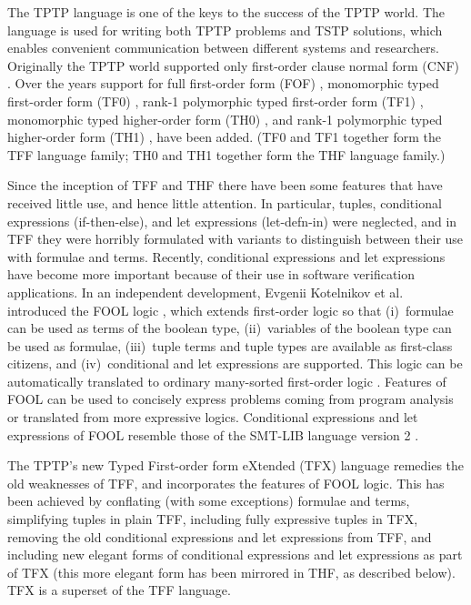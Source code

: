 \documentclass{easychair}
\begin{document}
The TPTP language is one of the keys to the success of the TPTP world.
The language is used for writing both TPTP problems and TSTP solutions,
which enables convenient communication between different systems and
researchers.
Originally the TPTP world supported only first-order clause normal form (CNF)
\cite{SS98-JAR}.
Over the years support for full first-order form (FOF) \cite{Sut09},
monomorphic typed first-order form (TF0) \cite{SS+12}, rank-1 polymorphic
typed first-order form (TF1) \cite{BP13-TFF1}, monomorphic typed higher-order 
form (TH0) \cite{SB10}, and rank-1 polymorphic typed higher-order form (TH1) 
\cite{KSR16}, have been added.
(TF0 and TF1 together form the TFF language family; TH0 and TH1 together form 
the THF language family.)

Since the inception of TFF and THF there have been some features that have 
received little use, and hence little attention. 
In particular, tuples, conditional expressions (if-then-else), and let 
expressions (let-defn-in) were neglected, and in TFF they were horribly 
formulated with variants to distinguish between their use with formulae and 
terms. 
Recently, conditional expressions and let expressions have become more 
important because of their use in software verification applications.
In an independent development, Evgenii Kotelnikov et al. introduced the FOOL 
logic \cite{KKV15}, which extends first-order logic so that (i)~formulae can 
be used as terms of the boolean type, (ii)~variables of the boolean type can 
be used as formulae, (iii)~tuple terms and tuple types are available as 
first-class citizens, and (iv)~conditional and let expressions are supported. 
This logic can be automatically translated to ordinary many-sorted first-order
logic \cite{KKV15}.
Features of FOOL can be used to concisely express problems coming from program
analysis \cite{KKV18} or translated from more expressive logics.
Conditional expressions and let expressions of FOOL resemble those of the 
SMT-LIB language version 2 \cite{BST10}.

The TPTP's new Typed First-order form eXtended (TFX) language remedies the
old weaknesses of TFF, and incorporates the features of FOOL logic.
This has been achieved by conflating (with some exceptions) formulae and 
terms, simplifying tuples in plain TFF, including fully expressive tuples in 
TFX, removing the old conditional expressions and let expressions from 
TFF, and including new elegant forms of conditional expressions and let 
expressions as part of TFX (this more elegant form has been mirrored in THF, 
as described below).
TFX is a superset of the TFF language. 
\end{document}
